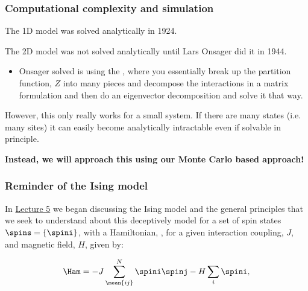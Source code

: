 \documentclass[hyperref={colorlinks=true}]{beamer}
\begin{document}
\begin{frame}%
  \frametitle{Computational complexity and simulation}
  
  The 1D model was solved analytically in 1924. 
  
  \vspace{0.3cm}
  
  The 2D model was not solved analytically until Lars Onsager did it in 1944. 
  \begin{itemize}
    \item Onsager solved is using the , where you essentially break up the partition function, $Z$ into many pieces and decompose the interactions in a matrix formulation and then do an eigenvector decomposition and solve it that way. 
  \end{itemize}
  
  \vspace{0.3cm}
  
  However, this only really works for a small system. If there are many states (i.e. many sites) it can easily become analytically intractable even if solvable in principle.
  
  \vspace{0.3cm}
  
  \begin{ucblock}{}
     \textbf{Instead, we will approach this using our Monte Carlo based approach!}
  \end{ucblock}
   
\end{frame}


\begin{frame}%
  \frametitle{Reminder of the Ising model}
  
  In \href{https://github.com/UChicagoPhysics/PHYS250/blob/master/Slides/Lecture5/PHYS250-Autumn2019-Lecture5.pdf}{Lecture 5} we began discussing the Ising model and the general principles that we seek to understand about this deceptively  model for a set of spin states $\spins = \{\spini\}$, with a Hamiltonian, \Ham, for a given interaction coupling, $J$, and magnetic field, $H$, given by:
  
  \begin{equation}
    \Ham = -J \sum_{\mean{ij}}^N \spini \spinj - H \sum_i \spini , \label{eq:ising-field}
  \end{equation} 
  
  \begin{ucblock}{}
  \end{ucblock}
  
\end{frame}
\end{document}
